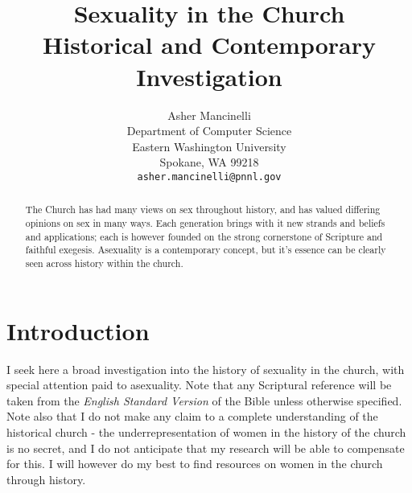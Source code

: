 \documentclass[12pt]{article}
\title{
    Sexuality in the Church \\ 
    \large Historical and Contemporary Investigation}
\author{
  Asher Mancinelli \\
  Department of Computer Science\\
  Eastern Washington University\\
  Spokane, WA 99218 \\
  \texttt{asher.mancinelli@pnnl.gov} \\ }
\begin{document}
\maketitle

\begin{abstract}
    The Church has had many views on sex throughout history, and has valued
    differing opinions on sex in many ways. Each generation brings with it
    new strands and beliefs and applications; each is however founded on the 
    strong cornerstone of Scripture and faithful exegesis. Asexuality is
    a contemporary concept, but it's essence can be clearly seen across
    history within the church.
\end{abstract}


\doublespace

\section{Introduction}
    I seek here a broad investigation into the 
    history of sexuality in the church, with special attention paid 
    to asexuality.  Note that any Scriptural reference will be taken 
    from the \textit{English Standard Version} of the Bible unless 
    otherwise specified. Note also that I do not make any claim to a complete
    understanding of the historical church - 
    the underrepresentation of women in the history of the church is no
    secret, and I do
    not anticipate that my research will be able to compensate for this.
    I will however do my best to find resources on women in the church
    through history.
\end{document}
